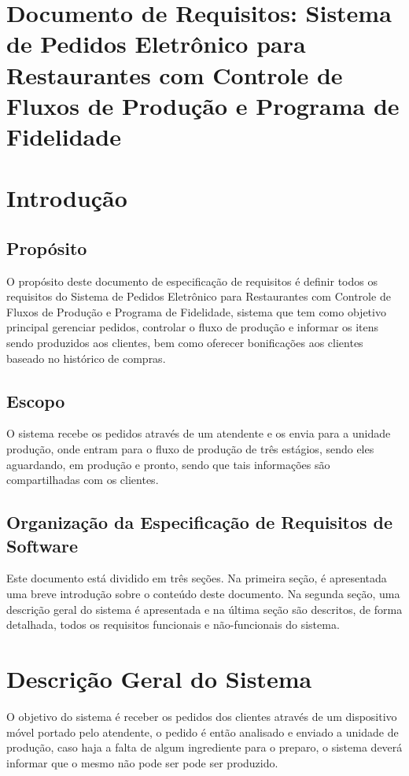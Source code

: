 \documentclass[article, 12pt, oneside, a4paper, brazil]{abntex2}
\begin{document}
\frenchspacing

\tableofcontents*
\cleardoublepage

 \section*{\textbf{Documento de Requisitos:} Sistema de Pedidos Eletrônico para Restaurantes com Controle de Fluxos de Produção e Programa de Fidelidade}
 \section{Introdução}
 
 \subsection{Propósito}
 O propósito deste documento de especificação de requisitos é definir todos os requisitos do Sistema de Pedidos Eletrônico para Restaurantes com Controle de Fluxos de Produção e Programa de Fidelidade, sistema que tem como objetivo principal gerenciar pedidos, controlar o fluxo de produção e informar os itens sendo produzidos aos clientes, bem como oferecer bonificações aos clientes baseado no histórico de compras.
 
 \subsection{Escopo}
 O sistema recebe os pedidos através de um atendente e os envia para a unidade produção, onde entram para o fluxo de produção de três estágios, sendo eles aguardando, em produção e pronto, sendo que tais informações são compartilhadas com os clientes.
 
 \subsection{Organização da Especificação de Requisitos de Software}
 
 Este documento está dividido em três seções. Na primeira seção, é apresentada uma breve introdução sobre o conteúdo deste documento. Na segunda seção, uma descrição geral do sistema é apresentada e na última seção são descritos, de forma detalhada, todos os requisitos funcionais e não-funcionais do sistema.
 
 \section{Descrição Geral do Sistema}
 O objetivo do sistema é receber os pedidos dos clientes através de um dispositivo móvel portado pelo atendente, o pedido é então analisado e enviado a unidade de produção, caso haja a falta de algum ingrediente para o preparo, o sistema deverá informar que o mesmo não pode ser pode ser produzido. 
 
\end{document}
